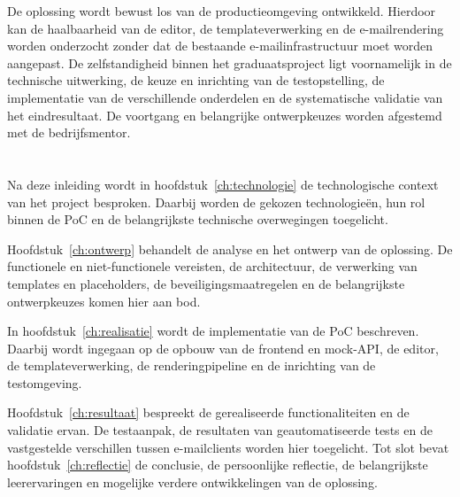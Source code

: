 De oplossing wordt bewust los van de productieomgeving ontwikkeld. Hierdoor
kan de haalbaarheid van de editor, de templateverwerking en de e-mailrendering
worden onderzocht zonder dat de bestaande e-mailinfrastructuur moet worden
aangepast. De zelfstandigheid binnen het graduaatsproject ligt voornamelijk
in de technische uitwerking, de keuze en inrichting van de testopstelling,
de implementatie van de verschillende onderdelen en de systematische
validatie van het eindresultaat. De voortgang en belangrijke ontwerpkeuzes
worden afgestemd met de bedrijfsmentor.

\section{}%
\label{sec:leeswijzer}
Na deze inleiding wordt in hoofdstuk~\ref{ch:technologie} de technologische
context van het project besproken. Daarbij worden de gekozen technologieën,
hun rol binnen de PoC en de belangrijkste technische overwegingen toegelicht.

Hoofdstuk~\ref{ch:ontwerp} behandelt de analyse en het ontwerp van de
oplossing. De functionele en niet-functionele vereisten, de architectuur,
de verwerking van templates en placeholders, de beveiligingsmaatregelen en
de belangrijkste ontwerpkeuzes komen hier aan bod.

In hoofdstuk~\ref{ch:realisatie} wordt de implementatie van de PoC beschreven.
Daarbij wordt ingegaan op de opbouw van de frontend en mock-API, de editor,
de templateverwerking, de renderingpipeline en de inrichting van de
testomgeving.

Hoofdstuk~\ref{ch:resultaat} bespreekt de gerealiseerde functionaliteiten
en de validatie ervan. De testaanpak, de resultaten van geautomatiseerde
tests en de vastgestelde verschillen tussen e-mailclients worden hier
toegelicht. Tot slot bevat hoofdstuk~\ref{ch:reflectie} de conclusie,
de persoonlijke reflectie, de belangrijkste leerervaringen en mogelijke
verdere ontwikkelingen van de oplossing.
